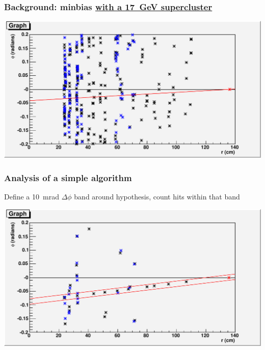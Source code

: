 \documentclass[12pt,compress]{beamer}
\begin{document}
\begin{frame}
\frametitle{Background: minbias \underline{with a 17~GeV supercluster}} %

\begin{center}
\includegraphics[width=\linewidth]{event_display_background}
\end{center}
\end{frame}

\begin{frame}
\frametitle{Analysis of a simple algorithm}

Define a 10~mrad $\Delta \phi$ band around hypothesis, count hits within that band

\begin{center}
\includegraphics[width=0.9\linewidth]{event_display_banded}
\end{center}
\end{frame}
\end{document}
